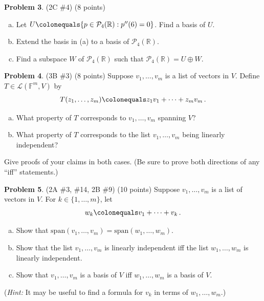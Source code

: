 \documentclass[reqno, 12pt]{amsart}
\theoremstyle{definition}
\newenvironment{problab}[1]
{\noindent\textbf{Problem #1}.}
{\vskip 6pt}
\theoremstyle{remark}
\newcommand{\F}{\mathbb F}
\newcommand{\R}{\mathbb R}
\renewcommand{\P}{\mathcal P}
\renewcommand{\L}{\mathcal L}
\newcommand{\SSpan}{\text{span}}
\begin{document}
\begin{problab}{3} (2C \#4) (8 points)
  \begin{enumerate}[(a)]
    \item
      Let $U \colonequals \{p \in \P_4(\R) : p''(6) = 0\}$. Find a basis of $U$.
    \item
      Extend the basis in (a) to a basis of $\P_4(\R)$.
    \item
      Find a subspace $W$ of $\P_4(\R)$ such that $\P_4(\R) = U \oplus W$.
  \end{enumerate}
\end{problab}

\begin{problab}{4} (3B \#3) (8 points)
  Suppose $v_1, \ldots, v_m$ is a list of vectors in $V$. Define $T \in \L(\F^m, V)$ by
  \begin{equation*}
    T(z_1, \ldots, z_m) \colonequals z_1 v_1 + \cdots + z_m v_m \, .
  \end{equation*}
  \begin{enumerate}[(a)]
    \item
      What property of $T$ corresponds to $v_1, \ldots, v_m$ spanning $V$?
    \item
      What property of $T$ corresponds to the list $v_1, \ldots, v_m$ being linearly independent?
  \end{enumerate}
  Give proofs of your claims in both cases. (Be sure to prove both directions of any ``iff'' statements.)
\end{problab}

\begin{problab}{5} (2A \#3, \#14, 2B \#9) (10 points)
  Suppose $v_1, \ldots, v_m$ is a list of vectors in $V$. For $k \in \{1, \ldots, m\}$, let
  \begin{equation*}
    w_k \colonequals v_1 + \cdots + v_k \, .
  \end{equation*}
    \begin{enumerate}[(a)]
      \item 
        Show that $\SSpan(v_1, \ldots, v_m) = \SSpan(w_1, \ldots, w_m)$.
      \item
        Show that the list $v_1, \ldots, v_m$ is linearly independent iff the list $w_1, \ldots, w_m$ is linearly independent.
      \item
        Show that $v_1, \ldots, v_m$ is a basis of $V$ iff $w_1, \ldots, w_m$ is a basis of $V$.
    \end{enumerate}
    (\textit{Hint:} It may be useful to find a formula for $v_k$ in terms of $w_1, \ldots, w_m$.)
\end{problab}
\end{document}
